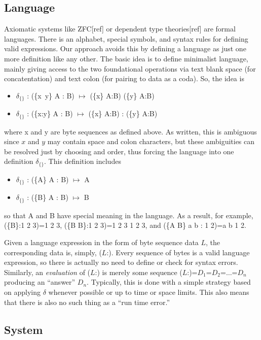 \documentclass[11pt]{article}
\begin{document}
\subsection{Language} 

Axiomatic systems like ZFC[ref] or dependent type theories[ref] are formal languages.  There is an alphabet, special symbols, and syntax rules 
for defining valid expressions.  Our approach avoids this by defining a language as just one more definition like any other.  The basic idea is to 
define minimalist language, mainly giving access to the two foundational operations via text blank space (for concatentation) and text colon (for pairing to data as a coda).  So, the idea is 
\begin{itemize}
\item {$\delta_{\{\}}$ : (\{x\ y\} A : B) $\mapsto$ (\{x\} A:B) (\{y\} A:B)}
\item {$\delta_{\{\}}$ : (\{x:y\} A : B) $\mapsto$ (\{x\} A:B) : (\{y\} A:B)}
\end{itemize}
where x and y are byte sequences as defined above.  As written, this is ambiguous since $x$ and $y$ may contain space and colon characters, but 
these ambiguities can be resolved just by choosing and order, thus forcing the language into one definition 
$\delta_{\{\}}$.  This definition includes 
\begin{itemize}
\item {$\delta_{\{\}}$ : (\{A\} A : B) $\mapsto$ A}
\item {$\delta_{\{\}}$ : (\{B\} A : B) $\mapsto$ B}
\end{itemize}
so that A and B have special meaning in the language.  As a result, for example, (\{B\}:1 2 3)=1 2 3, (\{B B\}:1 2 3)=1 2 3 1 2 3, and (\{A B\} a b : 1 2)=a b 1 2.  

     Given a language expression in the form of byte sequence data $L$, the corresponding data is, simply, ($L$:).  Every sequence of bytes is a valid language 
expression, so there is actually no need to define or check for syntax errors.  Similarly, an {\it evaluation} of ($L$:) is merely some sequence 
($L$:)=$D_1$=$D_2$=$\dots$=$D_n$ producing an ``answer'' $D_n$.  Typically, this is done with a simple strategy based on applying $\delta$ whenever 
possible or up to time or space limits.  This also means that there is also no such thing as a ``run time error.''    

\subsection{System} 
\end{document}
